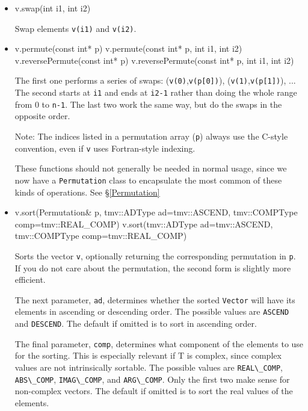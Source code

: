 \documentclass[twoside,letterpaper,11pt]{article}
\renewcommand{\tt}[1]{{\lstinline {#1}}}
\begin{document}
\begin{itemize}
\item
\begin{tmvcode}
v.swap(int i1, int i2)
\end{tmvcode}
Swap elements \tt{v(i1)} and \tt{v(i2)}.

\item
\begin{tmvcode}
v.permute(const int* p)
v.permute(const int* p, int i1, int i2)
v.reversePermute(const int* p)
v.reversePermute(const int* p, int i1, int i2)
\end{tmvcode}
The first one performs a series of swaps: (\tt{v(0)},\tt{v(p[0])}), (\tt{v(1)},\tt{v(p[1])}), ... 
The second starts at \tt{i1} and ends at \tt{i2-1} rather than
doing the whole range from 0 to \tt{n-1}.
The last two work the same way, but do the swaps in the opposite order.

Note: The indices listed in a permutation array (\tt{p}) always use 
the C-style convention, even if \tt{v} uses Fortran-style indexing.

These functions should not generally be needed in normal usage, since we now 
have a \tt{Permutation} class to encapsulate the most common of these kinds of 
operations.  See \S\ref{Permutation}

\item
\begin{tmvcode}
v.sort(Permutation& p, tmv::ADType ad=tmv::ASCEND, 
      tmv::COMPType comp=tmv::REAL_COMP)
v.sort(tmv::ADType ad=tmv::ASCEND, 
      tmv::COMPType comp=tmv::REAL_COMP)
\end{tmvcode}
Sorts the vector \tt{v}, optionally returning the corresponding permutation in \tt{p}.
If you do not care about the permutation, the second form is slightly more efficient.

The next parameter, \tt{ad}, determines whether the sorted \tt{Vector} 
will have its elements in ascending or descending order.  The possible values
are \tt{ASCEND} and \tt{DESCEND}.  The default if omitted is to sort
in ascending order.

The final parameter, \tt{comp}, determines what component of the
elements to use for the sorting.  This is especially relevant if T is complex, 
since complex values are not intrinsically sortable.
The possible values are
\tt{REAL\_COMP}, \tt{ABS\_COMP},
\tt{IMAG\_COMP}, and \tt{ARG\_COMP}.
Only the first two make sense for non-complex vectors.  The default if
omitted is to sort the real values of the elements.


\end{itemize}
\end{document}

